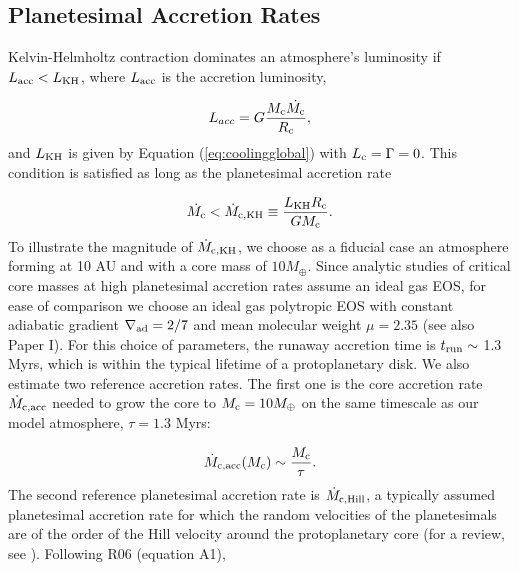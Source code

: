 \documentclass[apj]{emulateapj}
\newcommand{\delad}{\nabla_{\rm ad}}
\newcommand{\co}{_{\rm c}}
\begin{document}

\subsection{Planetesimal Accretion Rates}
\label{raf1}

Kelvin-Helmholtz contraction dominates an atmosphere's luminosity if  $L_{\mathrm{acc}} < L_{\rm{KH}}$, where $L_{\rm{acc}}$ is the accretion luminosity,

\begin{equation}
\label{eq:Lacc}
L_{acc}=G \frac{M_{\rm{c}} \dot{M_{\rm{c}}}}{R_{\rm{c}}},
\end{equation}
and $L_{\rm KH}$ is given by Equation (\ref{eq:coolingglobal}) with $L\co=\Gamma=0$. This condition is satisfied as long as the planetesimal accretion rate 

\begin{equation}
\label{eq:McdotKH}
\dot{M\co}<\dot{M}_{\rm c, KH} \equiv \frac{L_{\rm KH} R\co}{G M\co}.
\end{equation} 
To illustrate the magnitude of $\dot{M}_{\rm c, KH}$, we choose as a fiducial case an atmosphere forming at 10 AU and with a core mass of $10 M_{\oplus}$. Since analytic studies of critical core masses at high planetesimal accretion rates assume an ideal gas EOS, for ease of comparison we choose an ideal gas polytropic EOS with constant adiabatic gradient $\delad=2/7$ and mean molecular weight $\mu=2.35$ (see also Paper I). For this choice of parameters, the runaway accretion time is $t _{\rm run}\sim$ 1.3 Myrs, which is within the typical lifetime of a protoplanetary disk. We also estimate two reference accretion rates. The first one is the core accretion rate $\dot{M}_{\rm c, acc}$ needed to grow the core to $M\co=10 M_{\oplus}$ on the same timescale as our model atmosphere, $\tau=1.3$ Myrs:

\begin{equation}
\label{eq:Mcdot}
\dot{M}_{\rm{c,acc}}(M_{\rm{c}}) \sim \frac{M_{\rm{c}}}{\tau}.
\end{equation}
The second reference planetesimal accretion rate is $\dot{M}_{\rm c, Hill}$, a typically assumed planetesimal accretion rate for which the random velocities of the planetesimals are of the order of the Hill velocity around the protoplanetary core (for a review, see \citealt{goldreich04}). Following R06 (equation A1),
\end{document}
